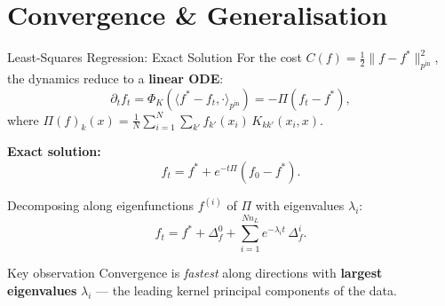 \documentclass[aspectratio=169, 10pt]{beamer}
\newcommand{\pin}{p^{\mathrm{in}}}
\newcommand{\highlight}[1]{\textcolor{blue!70!black}{\textbf{#1}}}
\begin{document}
\section{Convergence \& Generalisation}

\begin{frame}{Least-Squares Regression: Exact Solution}
  For the cost $C(f) = \tfrac12\|f - f^*\|^2_{\pin}$, the dynamics reduce to a \textbf{linear ODE}:
  \[
    \partial_t f_t = \Phi_K\!\left(\langle f^* - f_t, \cdot\rangle_{\pin}\right) = -\Pi(f_t - f^*),
  \]
  where $\Pi(f)_k(x) = \frac{1}{N}\sum_{i=1}^N\sum_{k'}f_{k'}(x_i)\,K_{kk'}(x_i, x)$.

  \vspace{0.3em}
  \textbf{Exact solution:}
  \[
    \boxed{f_t = f^* + e^{-t\Pi}(f_0 - f^*)}.
  \]

  Decomposing along eigenfunctions $f^{(i)}$ of $\Pi$ with eigenvalues $\lambda_i$:
  \[
    f_t = f^* + \Delta^0_f + \sum_{i=1}^{Nn_L} e^{-\lambda_i t}\,\Delta^i_f.
  \]

  \begin{exampleblock}{Key observation}
    Convergence is \emph{fastest} along directions with \highlight{largest eigenvalues} $\lambda_i$ — the leading kernel principal components of the data.
  \end{exampleblock}
\end{frame}
\end{document}
